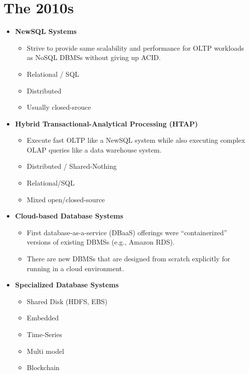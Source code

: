 \documentclass[11pt]{article}
\begin{document}
\section{The 2010s}
\begin{itemize}
    \item
    \textbf{NewSQL Systems}~\cite{aslett11,pavlo16}
    \begin{itemize}
        \item
        Strive to provide same scalability and performance for OLTP workloads as NoSQL DBMSs 
        without giving up ACID.
        \item Relational / SQL
        \item Distributed
        \item Usually closed-srouce
    \end{itemize}
    
    \item \textbf{Hybrid Transactional-Analytical Processing (HTAP)}~\cite{pezzini14}
    \begin{itemize}
        \item
        Execute fast OLTP like a NewSQL system while also executing complex OLAP queries like 
        a data warehouse system.
        \item Distributed / Shared-Nothing
        \item Relational/SQL
        \item Mixed open/closed-source
    \end{itemize}
    
    \item \textbf{Cloud-based Database Systems}
    \begin{itemize}
        \item
        First database-as-a-service (DBaaS) offerings were ``containerized'' versions of existing 
        DBMSs (e.g., Amazon RDS).
        
        \item
        There are new DBMSs that are designed from scratch explicitly for running in a cloud 
        environment.
    \end{itemize}
    
    \item \textbf{Specialized Database Systems}
    \begin{itemize}
        \item Shared Disk (HDFS, EBS)
        \item Embedded
        \item Time-Series
        \item Multi model
        \item Blockchain
    \end{itemize}
\end{itemize}

\newpage


\end{document}
